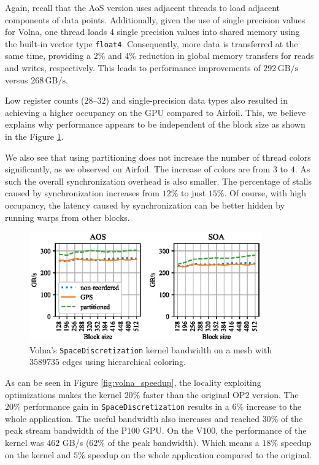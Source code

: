 Again, recall that the AoS version uses adjacent threads to load adjacent 
components of data points. Additionally, given the use of single precision 
values for Volna, one thread loads $4$ single precision values into shared 
memory using the built-in vector type \lstinline!float4!. Consequently, more 
data is transferred at the same time, providing a $2\%$ and $4\%$ reduction
in global memory transfers for reads and writes, respectively. This leads 
to performance improvements of $292\,\text{GB/s}$ versus $268\,\text{GB/s}$.

Low register counts ($28$--$32$) and single-precision data types also 
resulted in achieving a higher occupancy on the GPU compared to Airfoil. This, 
we believe explains why performance appears to be independent of the block size 
as shown in the Figure \ref{fig:volna_bw-vs-bs_hier}. 

We also see that using partitioning does not increase the number of thread 
colors significantly, as we observed on Airfoil. The increase of colors are 
from $3$ to $4$. As such the overall synchronization overhead is also smaller. 
The percentage of stalls caused by synchronization increases from $12\%$ to just 
$15\%$. Of course, with high occupancy, the latency caused by synchronization 
can be better hidden by running warps from other blocks. 


\begin{figure}[Htbp]
  \centering
  \includegraphics[width=10cm]{fig/volna_bw-vs-bs_hier.eps}
  \caption{Volna's \texttt{SpaceDiscretization} kernel bandwidth on a mesh with
  $3589735$ edges using hierarchical coloring.}
  \label{fig:volna_bw-vs-bs_hier}
\end{figure}

As can be seen in Figure \ref{fig:volna_speedup}, the locality exploiting 
optimizations makes the kernel $20\%$ faster than the original OP2 version. The 
$20\%$ performance gain in \texttt{SpaceDiscretization} results in a $6\%$ 
increase to the whole application. The useful bandwidth also increases and 
reached $30\%$ of the peak stream bandwidth of the P100 GPU. On the V100, the 
performance of the kernel was $462$ GB/s ($62\%$ of the peak bandwidth). Which 
means a $18\%$ speedup on the kernel and $5\%$ speedup on the whole
application compared to the original.

